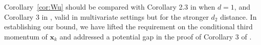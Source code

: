 Corollary~\ref{cor:Wu} should be compared with Corollary 2.3 in \cite{rollin2018} when $d=1$, and  Corollary 3 in \cite{JMLR2019CLT}, valid in multivariate settings but for the stronger $d_2$ distance. In establishing our bound, we have lifted the requirement on the conditional third momentum of $\bm{x}_k$ and addressed a potential gap in the proof of Corollary 3 of \cite{JMLR2019CLT}.


  



